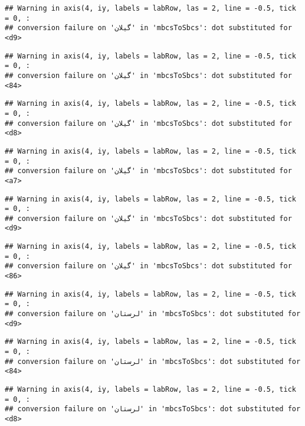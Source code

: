 \documentclass[
]{article}
\begin{document}
\begin{verbatim}
## Warning in axis(4, iy, labels = labRow, las = 2, line = -0.5, tick = 0, :
## conversion failure on 'گیلان' in 'mbcsToSbcs': dot substituted for <d9>
\end{verbatim}

\begin{verbatim}
## Warning in axis(4, iy, labels = labRow, las = 2, line = -0.5, tick = 0, :
## conversion failure on 'گیلان' in 'mbcsToSbcs': dot substituted for <84>
\end{verbatim}

\begin{verbatim}
## Warning in axis(4, iy, labels = labRow, las = 2, line = -0.5, tick = 0, :
## conversion failure on 'گیلان' in 'mbcsToSbcs': dot substituted for <d8>
\end{verbatim}

\begin{verbatim}
## Warning in axis(4, iy, labels = labRow, las = 2, line = -0.5, tick = 0, :
## conversion failure on 'گیلان' in 'mbcsToSbcs': dot substituted for <a7>
\end{verbatim}

\begin{verbatim}
## Warning in axis(4, iy, labels = labRow, las = 2, line = -0.5, tick = 0, :
## conversion failure on 'گیلان' in 'mbcsToSbcs': dot substituted for <d9>
\end{verbatim}

\begin{verbatim}
## Warning in axis(4, iy, labels = labRow, las = 2, line = -0.5, tick = 0, :
## conversion failure on 'گیلان' in 'mbcsToSbcs': dot substituted for <86>
\end{verbatim}

\begin{verbatim}
## Warning in axis(4, iy, labels = labRow, las = 2, line = -0.5, tick = 0, :
## conversion failure on 'لرستان' in 'mbcsToSbcs': dot substituted for <d9>
\end{verbatim}

\begin{verbatim}
## Warning in axis(4, iy, labels = labRow, las = 2, line = -0.5, tick = 0, :
## conversion failure on 'لرستان' in 'mbcsToSbcs': dot substituted for <84>
\end{verbatim}

\begin{verbatim}
## Warning in axis(4, iy, labels = labRow, las = 2, line = -0.5, tick = 0, :
## conversion failure on 'لرستان' in 'mbcsToSbcs': dot substituted for <d8>
\end{verbatim}
\end{document}
